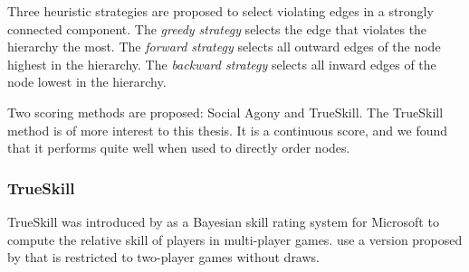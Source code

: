 Three heuristic strategies are proposed to select violating edges in a strongly connected component. The \textit{greedy strategy} selects the edge that violates the hierarchy the most. The \textit{forward strategy} selects all outward edges of the node highest in the hierarchy. The \textit{backward strategy} selects all inward edges of the node lowest in the hierarchy. 

Two scoring methods are proposed: Social Agony and TrueSkill. The TrueSkill method is of more interest to this thesis. It is a continuous score, and we found that it performs quite well when used to directly order nodes.

\subsubsection*{TrueSkill}
TrueSkill was introduced by \citet{herbrich2007trueskill} as a Bayesian skill rating system for Microsoft to compute the relative skill of players in multi-player games. \citet{sun2017breaking} use a version proposed by \citet{liu2013question} that is restricted to two-player games without draws. 



